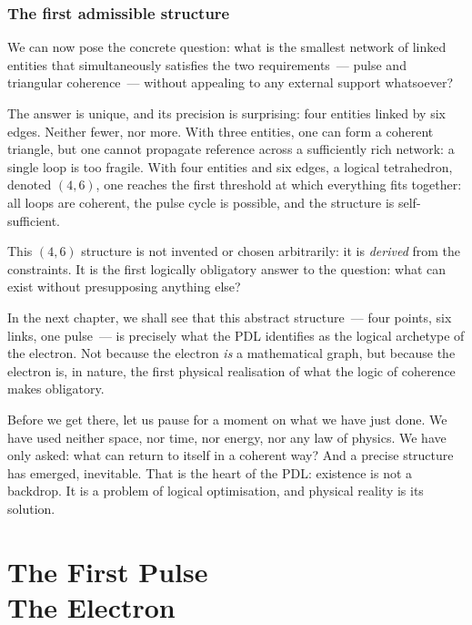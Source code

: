 \documentclass[12pt, a4paper, openright]{book}
\begin{document}
\subsection*{The first admissible structure}

We can now pose the concrete question: what is the smallest network of linked entities that simultaneously satisfies the two requirements~--- pulse and triangular coherence~--- without appealing to any external support whatsoever?

\medskip

The answer is unique, and its precision is surprising: four entities linked by six edges. Neither fewer, nor more. With three entities, one can form a coherent triangle, but one cannot propagate reference across a sufficiently rich network: a single loop is too fragile. With four entities and six edges, a logical tetrahedron, denoted $(4,6)$, one reaches the first threshold at which everything fits together: all loops are coherent, the pulse cycle is possible, and the structure is self-sufficient.

\medskip

This $(4,6)$ structure is not invented or chosen arbitrarily: it is \emph{derived} from the constraints. It is the first logically obligatory answer to the question: what can exist without presupposing anything else?

\medskip

In the next chapter, we shall see that this abstract structure~--- four points, six links, one pulse~--- is precisely what the PDL identifies as the logical archetype of the electron. Not because the electron \emph{is} a mathematical graph, but because the electron is, in nature, the first physical realisation of what the logic of coherence makes obligatory.

\medskip

Before we get there, let us pause for a moment on what we have just done. We have used neither space, nor time, nor energy, nor any law of physics. We have only asked: what can return to itself in a coherent way? And a precise structure has emerged, inevitable. That is the heart of the PDL: existence is not a backdrop. It is a problem of logical optimisation, and physical reality is its solution.

\chapter[The First Pulse --- The Electron]{The First Pulse \\ The Electron}
\end{document}
